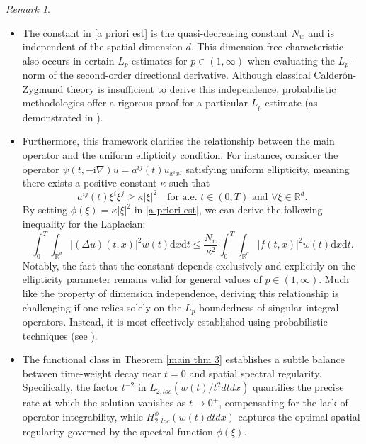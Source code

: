 \documentclass[11pt,reqno]{amsart}
\theoremstyle{definition}
\theoremstyle{remark}
\newtheorem{rem}[thm]{Remark}
\newcommand\bR{\mathbb{R}}
\numberwithin{equation}{section}
\begin{document}
\begin{rem}
\begin{itemize}
\item


The constant in \eqref{a priori est} is the quasi-decreasing constant $N_w$ and is independent of the spatial dimension $d$. 
This dimension-free characteristic also occurs in certain $L_p$-estimates for $p \in (1,\infty)$ when evaluating the $L_p$-norm of the second-order directional derivative. 
Although classical Calderón-Zygmund theory is insufficient to derive this independence, probabilistic methodologies offer a rigorous proof for a particular $L_p$-estimate (as demonstrated in \cite{KP1}).


\item

Furthermore, this framework clarifies the relationship between the main operator and the uniform ellipticity condition. 
For instance, consider the operator $\psi(t, -\mathrm{i}\nabla)u = a^{ij}(t)u_{x^ix^j}$ satisfying uniform ellipticity, meaning there exists a positive constant $\kappa$ such that
$$
a^{ij}(t) \xi^i\xi^j \geq \kappa |\xi|^2 \quad \text{for a.e. } t \in (0,T) \text{ and } \forall \xi \in \bR^d.
$$
By setting $\phi(\xi) = \kappa |\xi|^2$ in \eqref{a priori est}, we can derive the following inequality for the Laplacian:
$$
\int_0^T \int_{\bR^d} \left| (\Delta u) (t,x)\right|^2 w(t)\mathrm{d}x\mathrm{d}t \leq \frac{N_w}{\kappa^2} \int_0^T\int_{\bR^d}|f(t,x)|^2 w(t) \mathrm{d}x\mathrm{d}t.
$$
Notably, the fact that the constant depends exclusively and explicitly on the ellipticity parameter remains valid for general values of $p \in (1,\infty)$. 
Much like the property of dimension independence, deriving this relationship is challenging if one relies solely on the $L_p$-boundedness of singular integral operators. 
Instead, it is most effectively established using probabilistic techniques (see \cite{KID 2024, KK 2023}).


\item The functional class in Theorem \ref{main thm 3} establishes a subtle balance between time-weight decay near $t=0$ and spatial spectral regularity. 
Specifically, the factor $t^{-2}$ in $L_{2,loc}(w(t)/t^2 dtdx)$ quantifies the precise rate at which the solution vanishes as $t \to 0^+$, compensating for the lack of operator integrability, while $H_{2,loc}^\phi(w(t)dtdx)$ captures the optimal spatial regularity governed by the spectral function $\phi(\xi)$.

\end{itemize}
\end{rem}
\end{document}
